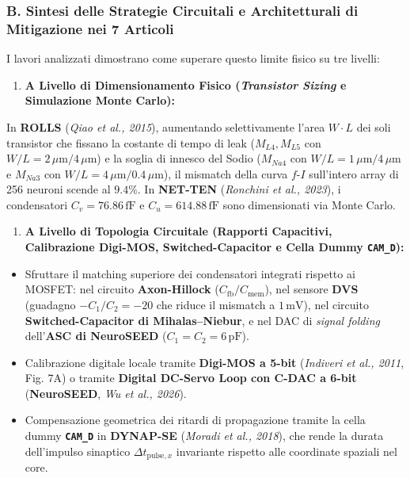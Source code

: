 \documentclass[11pt,a4paper]{article}
\begin{document}
\subsubsection{B. Sintesi delle Strategie Circuitali e Architetturali di Mitigazione nei 7 Articoli}
I lavori analizzati dimostrano come superare questo limite fisico su tre livelli:
\begin{enumerate}
  \item \textbf{A Livello di Dimensionamento Fisico (\textit{Transistor Sizing} e Simulazione Monte Carlo):}
\end{enumerate}
In \textbf{ROLLS} (\textit{Qiao et al., 2015}), aumentando selettivamente l'area $W \cdot L$ dei soli transistor che fissano la costante di tempo di leak ($M_{L4}, M_{L5}$ con $W/L = 2\,\mu\text{m}/4\,\mu\text{m}$) e la soglia di innesco del Sodio ($M_{Na4}$ con $W/L = 1\,\mu\text{m}/4\,\mu\text{m}$ e $M_{Na3}$ con $W/L = 4\,\mu\text{m}/0.4\,\mu\text{m}$), il mismatch della curva $f\text{-}I$ sull'intero array di 256 neuroni scende al \textbf{$9.4\%$}. In \textbf{NET-TEN} (\textit{Ronchini et al., 2023}), i condensatori $C_v = 76.86\,\text{fF}$ e $C_u = 614.88\,\text{fF}$ sono dimensionati via Monte Carlo.
\begin{enumerate}
  \item \textbf{A Livello di Topologia Circuitale (Rapporti Capacitivi, Calibrazione Digi-MOS, Switched-Capacitor e Cella Dummy \texttt{CAM\_D}):}
\end{enumerate}
\begin{itemize}
  \item Sfruttare il matching superiore dei condensatori integrati rispetto ai MOSFET: nel circuito \textbf{Axon-Hillock} ($C_{\text{fb}}/C_{\text{mem}}$), nel sensore \textbf{DVS} (guadagno $-C_1/C_2 = -20$ che riduce il mismatch a $1\,\text{mV}$), nel circuito \textbf{Switched-Capacitor di Mihalas--Niebur}, e nel DAC di \textit{signal folding} dell'\textbf{ASC di NeuroSEED} ($C_1 = C_2 = 6\,\text{pF}$).
  \item Calibrazione digitale locale tramite \textbf{Digi-MOS a 5-bit} (\textit{Indiveri et al., 2011}, Fig. 7A) o tramite \textbf{Digital DC-Servo Loop con C-DAC a 6-bit} (\textbf{NeuroSEED}, \textit{Wu et al., 2026}).
  \item Compensazione geometrica dei ritardi di propagazione tramite la cella dummy \textbf{\texttt{CAM\_D}} in \textbf{DYNAP-SE} (\textit{Moradi et al., 2018}), che rende la durata dell'impulso sinaptico $\Delta t_{\text{pulse},x}$ invariante rispetto alle coordinate spaziali nel core.
\end{itemize}
\end{document}
